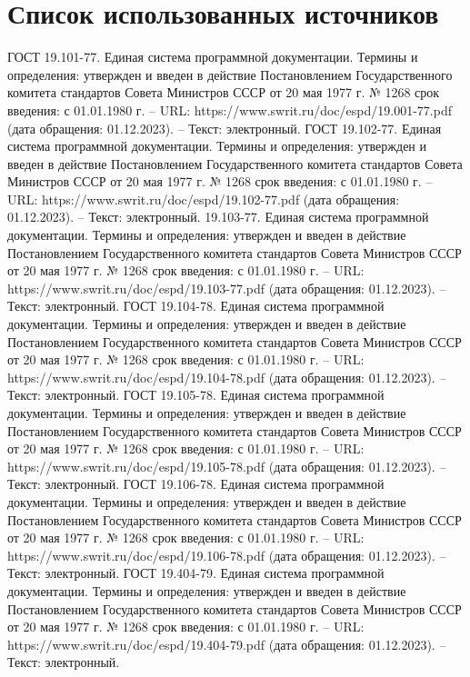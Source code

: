 \documentclass{article}
\begin{document}
    \section{Список использованных источников}
    \begin{thebibliography}{}
         ГОСТ 19.101-77. Единая система программной документации. Термины и определения: утвержден и введен в действие Постановлением Государственного комитета стандартов Совета Министров СССР от 20 мая 1977 г. № 1268 срок введения: с 01.01.1980 г. – URL: https://www.swrit.ru/doc/espd/19.001-77.pdf (дата обращения: 01.12.2023). – Текст: электронный.
         ГОСТ 19.102-77. Единая система программной документации. Термины и определения: утвержден и введен в действие Постановлением Государственного комитета стандартов Совета Министров СССР от 20 мая 1977 г. № 1268 срок введения: с 01.01.1980 г. – URL: https://www.swrit.ru/doc/espd/19.102-77.pdf (дата обращения: 01.12.2023). – Текст: электронный.
         19.103-77. Единая система программной документации. Термины и определения: утвержден и введен в действие Постановлением Государственного комитета стандартов Совета Министров СССР от 20 мая 1977 г. № 1268 срок введения: с 01.01.1980 г. – URL: https://www.swrit.ru/doc/espd/19.103-77.pdf (дата обращения: 01.12.2023). – Текст: электронный.
         ГОСТ 19.104-78. Единая система программной документации. Термины и определения: утвержден и введен в действие Постановлением Государственного комитета стандартов Совета Министров СССР от 20 мая 1977 г. № 1268 срок введения: с 01.01.1980 г. – URL: https://www.swrit.ru/doc/espd/19.104-78.pdf (дата обращения: 01.12.2023). – Текст: электронный.
         ГОСТ 19.105-78. Единая система программной документации. Термины и определения: утвержден и введен в действие Постановлением Государственного комитета стандартов Совета Министров СССР от 20 мая 1977 г. № 1268 срок введения: с 01.01.1980 г. – URL: https://www.swrit.ru/doc/espd/19.105-78.pdf (дата обращения: 01.12.2023). – Текст: электронный.
         ГОСТ 19.106-78. Единая система программной документации. Термины и определения: утвержден и введен в действие Постановлением Государственного комитета стандартов Совета Министров СССР от 20 мая 1977 г. № 1268 срок введения: с 01.01.1980 г. – URL: https://www.swrit.ru/doc/espd/19.106-78.pdf (дата обращения: 01.12.2023). – Текст: электронный.
         ГОСТ 19.404-79. Единая система программной документации. Термины и определения: утвержден и введен в действие Постановлением Государственного комитета стандартов Совета Министров СССР от 20 мая 1977 г. № 1268 срок введения: с 01.01.1980 г. – URL: https://www.swrit.ru/doc/espd/19.404-79.pdf (дата обращения: 01.12.2023). – Текст: электронный.

\end{thebibliography}
\end{document}
